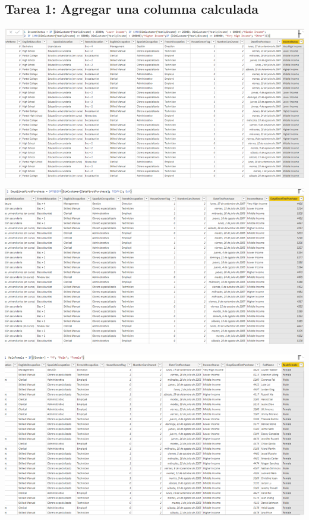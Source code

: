 \documentclass[12pt,letterpaper]{article}
\begin{document}
\subsection{Tarea 1: Agregar una columna calculada}
\begin{center}
\includegraphics[width=16cm]{images/11}\newline
\end{center}
\begin{center}
\includegraphics[width=16cm]{images/12}\newline
\end{center}
\begin{center}
\includegraphics[width=16cm]{images/13}\newline
\end{center}
\end{document}

